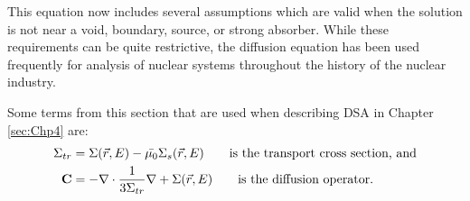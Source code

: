 This equation now includes several assumptions which are valid when the solution is not near a void, boundary, source, or strong absorber. While these requirements can be quite restrictive, the diffusion equation has been used frequently for analysis of nuclear systems throughout the history of the nuclear industry.

Some terms from this section that are used when describing DSA in Chapter \ref{sec:Chp4} are:
\begin{align}
  \Sigma_{tr} &= \Sigma(\vec{r},E) - \bar{\mu_{0}}\Sigma_{s}(\vec{r},E) \qquad \text{is the transport cross section, and}\\
  \mathbf{C} &= -\nabla \cdot \frac{1}{3\Sigma_{tr}}\nabla+ \Sigma(\vec{r},E) \qquad \text{is the diffusion operator.}
\end{align}

